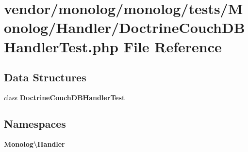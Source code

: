 \section{vendor/monolog/monolog/tests/\+Monolog/\+Handler/\+Doctrine\+Couch\+D\+B\+Handler\+Test.php File Reference}
\label{_doctrine_couch_d_b_handler_test_8php}
\subsection*{Data Structures}
\begin{DoxyCompactItemize}
\item 
class {\bf Doctrine\+Couch\+D\+B\+Handler\+Test}
\end{DoxyCompactItemize}
\subsection*{Namespaces}
\begin{DoxyCompactItemize}
\item 
 {\bf Monolog\textbackslash{}\+Handler}
\end{DoxyCompactItemize}
